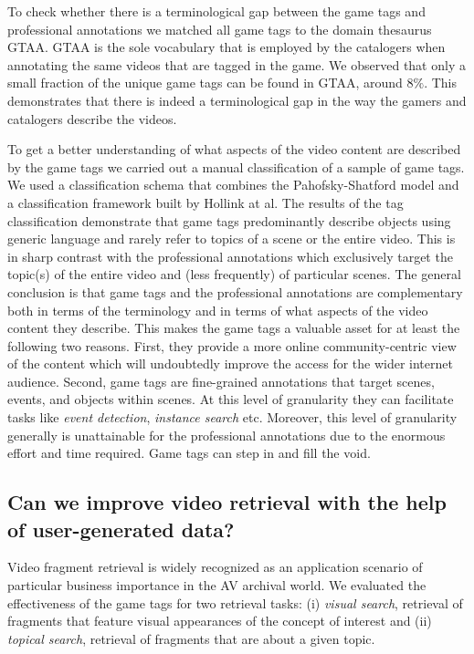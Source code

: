 To check whether there is a terminological gap between the game tags and professional annotations we matched all game tags to the domain thesaurus GTAA. GTAA is the sole vocabulary that is employed by the catalogers when annotating the same videos that are tagged in the game. We observed that only a small fraction of the unique game tags can be found in GTAA, around $8\%$. This demonstrates that there is indeed a terminological gap in the way the gamers and catalogers describe the videos.

To get a better understanding of what aspects of the video content are described by the game tags we carried out a manual classification of a sample of game tags. We used a classification schema that combines the Pahofsky-Shatford model and a classification framework built by Hollink at al. The results of the tag classification demonstrate that game tags predominantly describe objects using generic language and rarely refer to topics of a scene or the entire video. This is in sharp contrast with the professional annotations which exclusively target the topic(s) of the entire video and (less frequently) of particular scenes. The general conclusion is that game tags and the professional annotations are complementary both in terms of the terminology and in terms of what aspects of the video content they describe. This makes the game tags a valuable asset for at least the following two reasons. First, they provide a more online community-centric view of the content which will undoubtedly improve the access for the wider internet audience. Second, game tags are fine-grained annotations that target scenes, events, and objects within scenes. At this level of granularity they can facilitate tasks like \textit{event detection}, \textit{instance search} etc. Moreover, this level of granularity generally is unattainable for the professional annotations due to the enormous effort and time required. Game tags can step in and fill the void.
\subsection{Can we improve video retrieval with the help of user-generated data?}\label{conclusion:search}
Video fragment retrieval is widely recognized as an application scenario of particular business importance in the AV archival world. We evaluated the effectiveness of the game tags for two retrieval tasks: (i) \textit{visual search}, retrieval of fragments that feature visual appearances of the concept of interest and (ii) \textit{topical search}, retrieval of fragments that are about a given topic.
